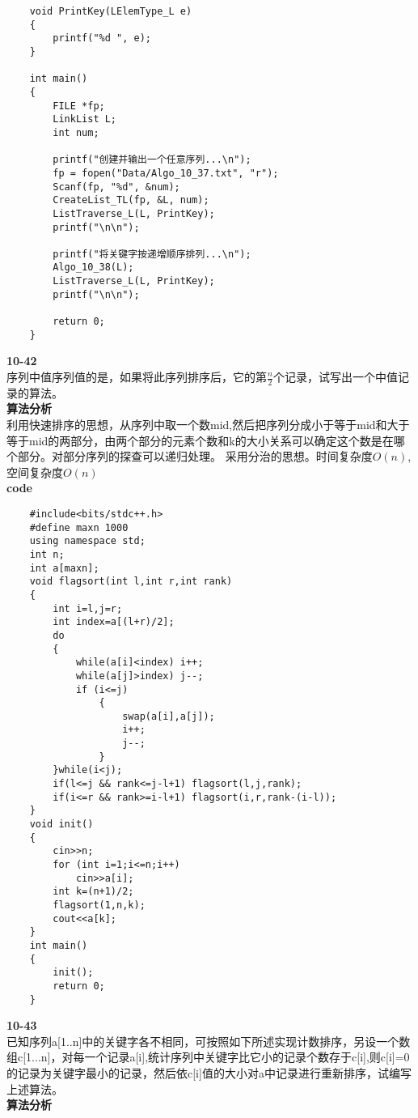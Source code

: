 \documentclass[UTF8,a4paper]{article}
\begin{document}
\begin{lstlisting}
    void PrintKey(LElemType_L e)
    {
        printf("%d ", e);
    }
    
    int main()
    {	
        FILE *fp;
        LinkList L;
        int num;
            
        printf("创建并输出一个任意序列...\n");
        fp = fopen("Data/Algo_10_37.txt", "r");
        Scanf(fp, "%d", &num);
        CreateList_TL(fp, &L, num);
        ListTraverse_L(L, PrintKey);
        printf("\n\n");	
    
        printf("将关键字按递增顺序排列...\n");
        Algo_10_38(L); 
        ListTraverse_L(L, PrintKey);
        printf("\n\n");	
    
        return 0;
    }
\end{lstlisting}
\textbf{10-42}\\
序列中值序列值的是，如果将此序列排序后，它的第$\frac{n}{2}$个记录，试写出一个中值记录的算法。\\
\textbf{算法分析}\\
利用快速排序的思想，从序列中取一个数mid,然后把序列分成小于等于mid和大于等于mid的两部分，由两个部分的元素个数和k的大小关系可以确定这个数是在哪个部分。对部分序列的探查可以递归处理。
采用分治的思想。时间复杂度$O(n)$,空间复杂度$O(n)$\\
\textbf{code}
\begin{lstlisting}
    #include<bits/stdc++.h>
    #define maxn 1000
    using namespace std;
    int n;
    int a[maxn];
    void flagsort(int l,int r,int rank)
    {
        int i=l,j=r;
        int index=a[(l+r)/2];
        do
        {
            while(a[i]<index) i++;
            while(a[j]>index) j--;
            if (i<=j)
                {
                    swap(a[i],a[j]);
                    i++;
                    j--;
                }
        }while(i<j);
        if(l<=j && rank<=j-l+1) flagsort(l,j,rank);
        if(i<=r && rank>=i-l+1) flagsort(i,r,rank-(i-l));
    }
    void init()
    {
        cin>>n;
        for (int i=1;i<=n;i++)
            cin>>a[i];
        int k=(n+1)/2;
        flagsort(1,n,k);
        cout<<a[k];
    }
    int main()
    {
        init();   
        return 0;
    }
\end{lstlisting}    
\textbf{10-43}\\
已知序列a[1..n]中的关键字各不相同，可按照如下所述实现计数排序，另设一个数组c[1...n]，对每一个记录a[i],统计序列中关键字比它小的记录个数存于c[i],则c[i]=0的记录为关键字最小的记录，然后依c[i]值的大小对a中记录进行重新排序，试编写上述算法。\\
\textbf{算法分析}\\
\end{document}

